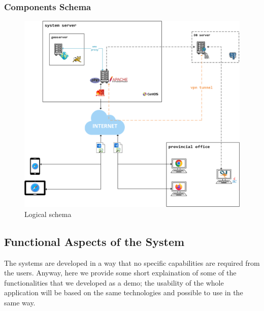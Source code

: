 \subsubsection{Components Schema}
\begin{figure}[H]
    \includegraphics[width=\textwidth]{img/system}
    \caption{Logical schema}
    \label{LogicalSchema}
\end{figure}

\subsection{Functional Aspects of the System}
The systems are developed in a way that no specific capabilities are required from the users.
Anyway, here we provide some short explaination of some of the functionalities that we developed as a demo; the usability of the whole application will be based on the same technologies and possible to use in the same way. 

